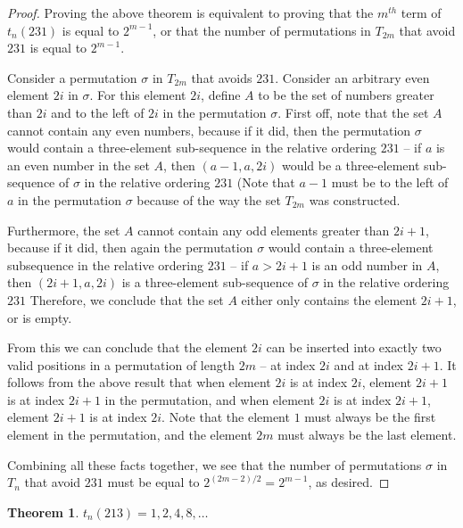 \documentclass[11pt,letterpaper,twoside,english]{article}
\theoremstyle{theorem}
\newtheorem{theorem}{Theorem}
\theoremstyle{remark}
\begin{document}
\begin{proof}
Proving the above theorem is equivalent to proving that the $m^{th}$ term of $t_n(231)$ is equal to $2^{m-1}$, or that the number of permutations in $T_{2m}$ that avoid $231$ is equal to $2^{m-1}$.

Consider a permutation $\sigma$ in $T_{2m}$ that avoids $231$. Consider an arbitrary even element $2i$ in $\sigma$. For this element $2i$, define $A$ to be the set of numbers greater than $2i$ and to the left of $2i$ in the permutation $\sigma$. First off, note that the set $A$ cannot contain any even numbers, because if it did, then the permutation $\sigma$ would contain a three-element sub-sequence in the relative ordering $231$ -- if $a$ is an even number in the set $A$, then $(a-1, a, 2i)$ would be a three-element sub-sequence of $\sigma$ in the relative ordering $231$ (Note that $a-1$ must be to the left of $a$ in the permutation $\sigma$ because of the way the set $T_{2m}$ was constructed.

Furthermore, the set $A$ cannot contain any odd elements greater than $2i+1$, because if it did, then again the permutation $\sigma$ would contain a three-element subsequence in the relative ordering $231$ -- if $a > 2i+1$ is an odd number in $A$, then $(2i+1, a, 2i)$ is a three-element sub-sequence of $\sigma$ in the relative ordering $231$ Therefore, we conclude that the set $A$ either only contains the element $2i+1$, or is empty.

From this we can conclude that the element $2i$ can be inserted into exactly two valid positions in a permutation of length $2m$ -- at index $2i$ and at index $2i+1$. It follows from the above result that when element $2i$ is at index $2i$, element $2i+1$ is at index $2i+1$ in the permutation, and when element $2i$ is at index $2i+1$, element $2i+1$ is at index $2i$. Note that the element $1$ must always be the first element in the permutation, and the element $2m$ must always be the last element.

Combining all these facts together, we see that the number of permutations $\sigma$ in $T_n$ that avoid $231$ must be equal to $2^{(2m-2)/2} = 2^{m-1}$, as desired.

\end{proof}

\begin{theorem}
$t_n(213) = 1, 2, 4, 8, \ldots$
\end{theorem}
\end{document}

